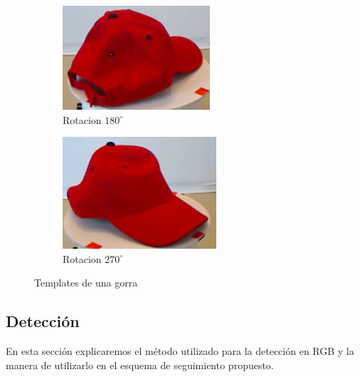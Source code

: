\begin{figure}
	\begin{subfigure}[b]{0.25\textwidth}
		\includegraphics[width=\textwidth]{img/templates/180_crop.png}
		\caption{Rotacion $180^{\circ}$}
	\end{subfigure}
	\quad
	\begin{subfigure}[b]{0.25\textwidth}
		\includegraphics[width=\textwidth]{img/templates/270_crop.png}
		\caption{Rotacion $270^{\circ}$}
	\end{subfigure}
	\caption{Templates de una gorra}
	\label{templates_objeto}
\end{figure}

\subsection{Detección}\label{deteccion_rgb}
En esta sección explicaremos el método utilizado para la detección en RGB y la manera de utilizarlo en el esquema de seguimiento propuesto.


